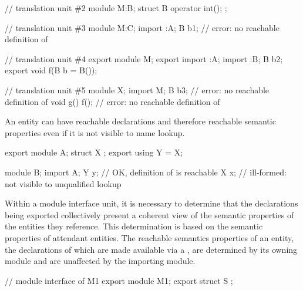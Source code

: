\begin{std.txt}
\begin{example}
\begin{codeblock}
// translation unit \#2
module M:B;
struct B {
  operator int();
};

// translation unit \#3
module M:C;
import :A;
B b1;                     // error: no reachable definition of 

// translation unit \#4
export module M;
export import :A;
import :B;
B b2;
export void f(B b = B());

// translation unit \#5
module X;
import M;
B b3;                     // error: no reachable definition of 
void g() { f(); }         // error: no reachable definition of 
\end{codeblock}
\end{example}
\exitnote


\pnum
\enternote
An entity can have reachable declarations and therefore
reachable semantic properties even if it is not visible
to name lookup.
\exitnote
\begin{example}
\begin{codeblock}
export module A;
struct X {};
export using Y = X;

module B;
import A;
Y y;            // OK, definition of  is reachable
X x;            // ill-formed:  not visible to unqualified lookup
\end{codeblock}
\end{example}

\begin{before}\color{addclr}
  \pnum
  Within a module interface unit, it is necessary to determine that the
  declarations being exported collectively present a coherent view of 
  the semantic properties of the entities they reference.  This determination
  is based on the semantic properties of attendant entities.
  \enternote
  The reachable semantics properties of an entity, the declarations of which
  are made available via a , are
  determined by its owning module and are unaffected by the importing module.
\end{before}\begin{before}\color{addclr}
  \begin{example}
    \begin{codeblock}
      // module interface of M1
      export module M1;
      export struct S { };


\end{codeblock}
\end{example}
\end{before}
\end{std.txt}
